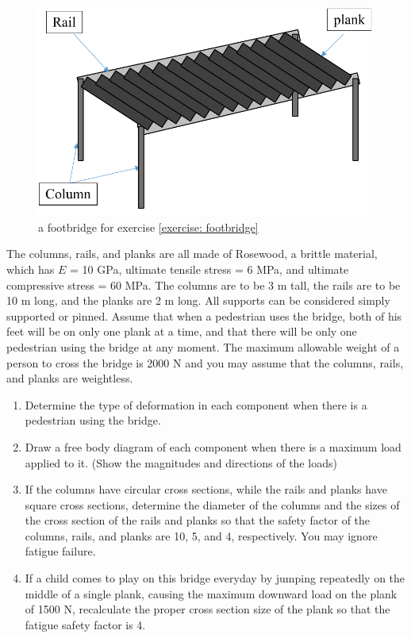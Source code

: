 \documentclass[
10pt,
a4paper,
openany,
svgnames,
]{book}
\begin{document}
\begin{exercises}
  \begin{figure}[H]
    \centering
    \includegraphics[scale=0.8]{pictures/Simple-load-bearing/footbridge}
    \caption{a footbridge for exercise \ref{exercise: footbridge}}
    \label{fig: footbridge exercise}
  \end{figure}
  
  The columns, rails, and planks are all made of Rosewood, a brittle material, which has $E$ = 10 GPa, ultimate tensile stress = 6 MPa, and ultimate compressive stress = 60 MPa. The columns are to be 3 m tall, the rails are to be 10 m long, and the planks are 2 m long. All supports can be considered simply supported or pinned. Assume that when a pedestrian uses the bridge, both of his feet will be on only one plank at a time, and that there will be only one pedestrian using the bridge at any moment. The maximum allowable weight of a person to cross the bridge is 2000 N and you may assume that the columns, rails, and planks are weightless.
  \begin{enumerate}
  \item Determine the type of deformation in each component when there is a pedestrian using the bridge.
  \item Draw a free body diagram of each component when there is a maximum load applied to it. (Show the magnitudes and directions of the loads)
  \item If the columns have circular cross sections, while the rails and planks have square cross sections, determine the diameter of the columns and the sizes of the cross section of the rails and planks so that the safety factor of the columns, rails, and planks are 10, 5, and 4, respectively. You may ignore fatigue failure.
  \item If a child comes to play on this bridge everyday by jumping repeatedly on the middle of a single plank, causing the maximum downward load on the plank of 1500 N, recalculate the proper cross section size of the plank so that the fatigue safety factor is 4.
  \end{enumerate}

\end{exercises}
\end{document}
